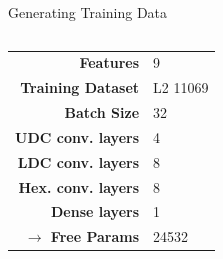 \begin{frame}{Generating Training Data}
    \begin{columns}
        \begin{column}{.35\textwidth}
            \begin{tabular}{>{\small\bf}r l}
                \toprule
                Features                  & 9         \\
                Training Dataset          & L2 11069  \\
                Batch Size                & 32        \\
                UDC conv. layers          & 4         \\
                LDC conv. layers          & 8         \\
                Hex. conv. layers         & 8         \\
                Dense layers              & 1\times50 \\
                $\rightarrow$ Free Params & 24532     \\
                \bottomrule
            \end{tabular}
        \end{column}
        \begin{column}{.65\textwidth}
            \begin{figure}
                \centering
            \end{figure}
        \end{column}
    \end{columns}
\end{frame}
